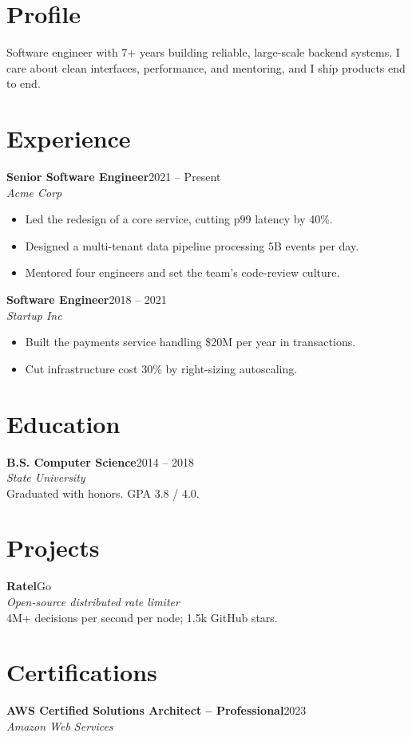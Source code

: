 \documentclass[10pt]{article}
\newlength{\mainwidth}\setlength{\mainwidth}{0.65\paperwidth}
\newcommand{\entry}[3]{{\bfseries #1}\hfill{\small\color{sidebar}#3}\\{\itshape #2}\\[2pt]}
\begin{document}
\begin{minipage}[t]{\mainwidth}
  \vspace{28pt}
  \hspace{22pt}\begin{minipage}{\dimexpr\mainwidth-44pt\relax}
    \section*{Profile}
    Software engineer with 7+ years building reliable, large-scale backend
    systems. I care about clean interfaces, performance, and mentoring, and I
    ship products end to end.

    \section*{Experience}
    \entry{Senior Software Engineer}{Acme Corp}{2021 -- Present}
    \begin{itemize}
      \item Led the redesign of a core service, cutting p99 latency by 40\%.
      \item Designed a multi-tenant data pipeline processing 5B events per day.
      \item Mentored four engineers and set the team's code-review culture.
    \end{itemize}
    \vspace{6pt}
    \entry{Software Engineer}{Startup Inc}{2018 -- 2021}
    \begin{itemize}
      \item Built the payments service handling \$20M per year in transactions.
      \item Cut infrastructure cost 30\% by right-sizing autoscaling.
    \end{itemize}

    \section*{Education}
    \entry{B.S. Computer Science}{State University}{2014 -- 2018}
    Graduated with honors. GPA 3.8 / 4.0.

    \section*{Projects}
    \entry{Ratel}{Open-source distributed rate limiter}{Go}
    4M+ decisions per second per node; 1.5k GitHub stars.

    \section*{Certifications}
    \entry{AWS Certified Solutions Architect -- Professional}{Amazon Web Services}{2023}
  \end{minipage}
\end{minipage}
\end{document}
